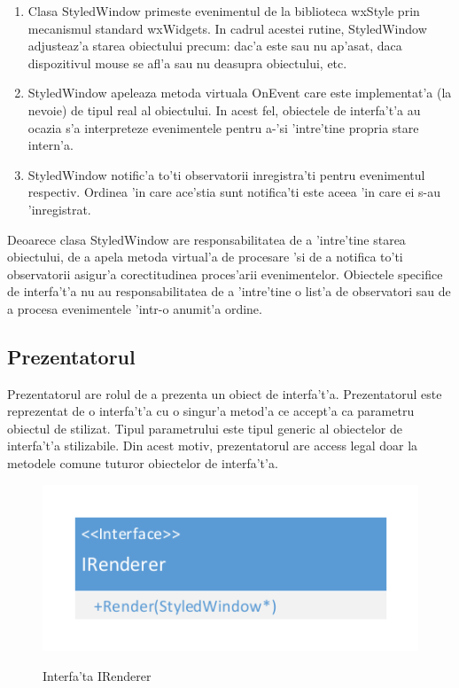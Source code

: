 \begin{enumerate}
\item Clasa StyledWindow primeste evenimentul de la biblioteca wxStyle prin mecanismul standard wxWidgets. In cadrul acestei rutine, StyledWindow adjusteaz'a starea obiectului precum: dac'a este sau nu ap'asat, daca dispozitivul mouse se afl'a sau nu deasupra obiectului, etc.
\item StyledWindow apeleaza metoda virtuala On{Event} care este implementat'a (la nevoie) de tipul real al obiectului. In acest fel, obiectele de interfa't'a au ocazia s'a interpreteze evenimentele pentru a-'si 'intre'tine propria stare intern'a.
\item StyledWindow notific'a to'ti observatorii inregistra'ti pentru evenimentul respectiv. Ordinea 'in care ace'stia sunt notifica'ti este aceea 'in care ei s-au 'inregistrat.
\end{enumerate}

Deoarece clasa StyledWindow are responsabilitatea de a 'intre'tine starea obiectului, de a apela metoda virtual'a de procesare 'si de a notifica to'ti observatorii asigur'a corectitudinea proces'arii evenimentelor. Obiectele specifice de interfa't'a nu au responsabilitatea de a 'intre'tine o list'a de observatori sau de a procesa evenimentele 'intr-o anumit'a ordine.

\subsection{Prezentatorul}

Prezentatorul are rolul de a prezenta un obiect de interfa't'a. Prezentatorul este reprezentat de o interfa't'a cu o singur'a metod'a ce accept'a ca parametru obiectul de stilizat. Tipul parametrului este tipul generic al obiectelor de interfa't'a stilizabile. Din acest motiv, prezentatorul are access legal doar la metodele comune tuturor obiectelor de interfa't'a.

\begin{center}
\begin{figure}[h]
    \centering
    \includegraphics{img/irenderer.pdf}
    \label{ch2_arhitectura_bloc}
    \caption{Interfa'ta IRenderer}
\end{figure}
\end{center}

